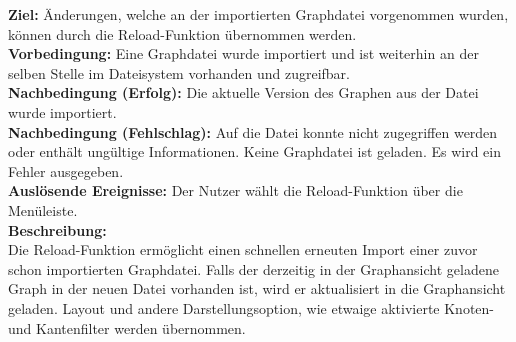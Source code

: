 \label{fa:reload}
\textbf{Ziel:} Änderungen, welche an der importierten Graphdatei vorgenommen wurden, können durch die Reload-Funktion übernommen werden.\\
\textbf{Vorbedingung:} Eine Graphdatei wurde importiert und ist weiterhin an der selben Stelle im Dateisystem vorhanden und zugreifbar.\\
\textbf{Nachbedingung (Erfolg):} Die aktuelle Version des Graphen aus der Datei wurde importiert.\\
\textbf{Nachbedingung (Fehlschlag):} Auf die Datei konnte nicht zugegriffen werden oder enthält ungültige Informationen. Keine Graphdatei ist geladen. Es wird ein Fehler ausgegeben.\\
\textbf{Auslösende Ereignisse:} Der Nutzer wählt die Reload-Funktion über die Menüleiste.\\
\textbf{Beschreibung:}\\
Die Reload-Funktion ermöglicht einen schnellen erneuten Import einer zuvor schon importierten Graphdatei.
Falls der derzeitig in der Graphansicht geladene Graph in der neuen Datei vorhanden ist, wird er aktualisiert in die Graphansicht geladen.
Layout und andere Darstellungsoption, wie etwaige aktivierte Knoten- und Kantenfilter werden übernommen.



%
